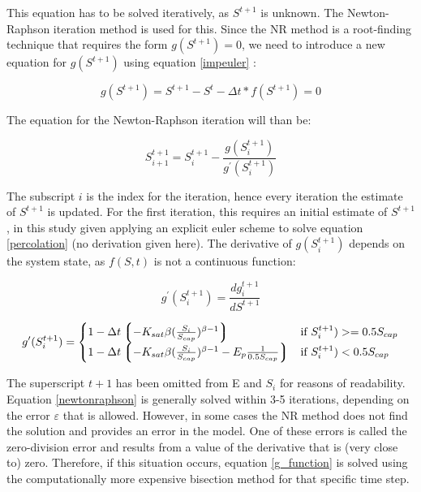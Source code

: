 This equation has to be solved iteratively, as $ S^{t+1} $ is unknown. The Newton-Raphson iteration method is used for this. Since the NR method is a root-finding technique that requires the form $ g(S^{t+1}) =0 $, we need to introduce a new equation for $  g(S^{t+1}) $ using equation \eqref{impeuler} :

\begin{equation}\label{g_function}
g(S^{t+1}) = S^{t+1} - S^t - \Delta{t} * f(S^{t+1}) = 0
\end{equation}

The equation for the Newton-Raphson iteration will than be:

\label{key}\begin{equation} \label{newtonraphson}
S^{t+1}_{i+1}=S^{t+1}_{i} - \frac{g(S^{t+1}_{i})}{g^{\prime} (S^{t+1}_{i})}
\end{equation}

The subscript $ i $ is the index for the iteration, hence every iteration the estimate of $ S^{t+1} $ is updated. For the first iteration, this requires an initial estimate of $ S^{t+1} $, in this study given applying an explicit euler scheme to solve equation \eqref{percolation} (no derivation given here). The derivative of $ g(S_i^{t+1}) $ depends on the system state, as $f(S,t)$ is not a continuous function:

\begin{equation}
g^{\prime} (S^{t+1}_{i}) = \frac{dg_{i}^{t+1}}{dS^{t+1}}
\end{equation}

\begin{equation}
g^{\prime} (S^{t+1}_{i}) =
\begin{cases}

1 - \Delta{t} \left\lgroup {  - K_{sat} \beta (\frac{S_i}{S_{cap}}) ^ {\beta-1}  } \right\rgroup 		& \text{if } S^{t+1}_{i}) >= 0.5 S_{cap} \\

1 - \Delta{t} \left\lgroup {  - K_{sat} \beta (\frac{S_i}{S_{cap}}) ^ {\beta-1}  - E_p  \frac{1}{0.5 S_{cap}} } \right\rgroup       & \text{if } S^{t+1}_{i}) < 0.5 S_{cap}
\end{cases}
\end{equation}

The superscript $ t+1 $ has been omitted from E and $ S_i $ for reasons of readability. Equation \eqref{newtonraphson} is generally solved within 3-5 iterations, depending on the error $\varepsilon $ that is allowed. However, in some cases the NR method does not find the solution and provides an error in the model. One of these errors is called the zero-division error and results from a value of the derivative that is (very close to) zero. Therefore, if this situation occurs, equation \eqref{g_function} is solved using the computationally more expensive bisection method for that specific time step.

